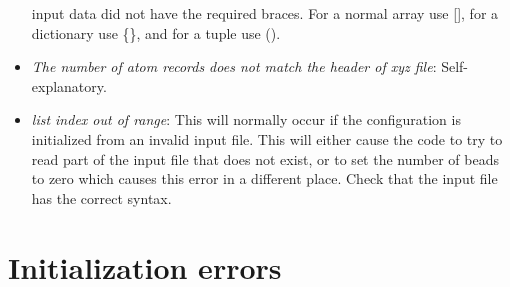 \documentclass[11pt,english,fleqn]{report}
\begin{document}
\begin{itemize}
input data did not have the required braces. For a normal array use
{[}{]}, for a dictionary use \{\}, and for a tuple use ().
\item \emph{The number of atom records does not match the header of xyz file}:
Self-explanatory.
\item \emph{list index out of range}: This will normally occur if the configuration
is initialized from an invalid input file. This will either cause
the code to try to read part of the input file that does not exist,
or to set the number of beads to zero which causes this error in a
different place. Check that the input file has the correct syntax.
\end{itemize}

\section{Initialization errors}
\end{document}
